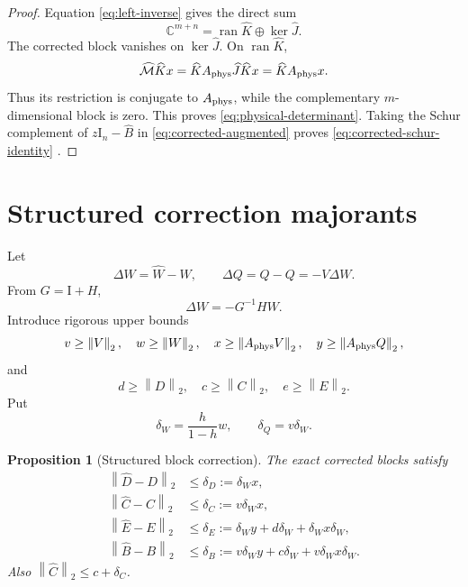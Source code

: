 \documentclass[11pt]{article}
\newtheorem{proposition}[theorem]{Proposition}
\theoremstyle{definition}
\theoremstyle{remark}
\newcommand{\C}{\mathbb C}
\newcommand{\Id}{\mathrm I}
\newcommand{\norm}[1]{\left\lVert#1\right\rVert}
\newcommand{\Aphys}{A_{\rm phys}}
\newcommand{\Mcorrected}{\widehat{\mathcal M}}
\begin{document}
\begin{proof}
Equation \cref{eq:left-inverse} gives the direct sum
\[
 \C^{m+n}=\operatorname{ran}\widehat K\oplus\ker\widehat J.
\]
The corrected block vanishes on \(\ker\widehat J\).  On
\(\operatorname{ran}\widehat K\),
\[
 \Mcorrected\widehat Kx
 =\widehat K\Aphys\widehat J\widehat Kx
 =\widehat K\Aphys x.
\]
Thus its restriction is conjugate to \(\Aphys\), while the complementary
\(m\)-dimensional block is zero.  This proves
\cref{eq:physical-determinant}.  Taking the Schur complement of
\(z\Id_n-\widehat B\) in \cref{eq:corrected-augmented} proves
\cref{eq:corrected-schur-identity}
\citep{HornJohnson2013}.
\end{proof}

\section{Structured correction majorants}
\label{sec:majorants}

Let
\[
 \Delta W=\widehat W-W,\qquad
 \Delta Q=\widehat Q-Q=-V\Delta W.
\]
From \(G=\Id+H\),
\begin{equation}
 \Delta W=-G^{-1}HW.
 \label{eq:delta-w}
\end{equation}
Introduce rigorous upper bounds
\begin{equation}
 v\geq\norm{V}_2,\quad
 w\geq\norm{W}_2,\quad
 x\geq\norm{\Aphys V}_2,\quad
 y\geq\norm{\Aphys Q}_2,
 \label{eq:base-norms}
\end{equation}
and
\begin{equation}
 d\geq\norm{D}_2,\quad
 c\geq\norm{C}_2,\quad
 e\geq\norm{E}_2.
 \label{eq:block-norms}
\end{equation}
Put
\begin{equation}
 \delta_W=\frac{h}{1-h}w,\qquad
 \delta_Q=v\delta_W.
 \label{eq:pair-majorants}
\end{equation}

\begin{proposition}[Structured block correction]
\label{prop:block-majorants}
The exact corrected blocks satisfy
\begin{align}
 \norm{\widehat D-D}_2
 &\leq \delta_D:=\delta_W x,
 \label{eq:delta-d}\\
 \norm{\widehat C-C}_2
 &\leq \delta_C:=v\delta_W x,
 \label{eq:delta-c}\\
 \norm{\widehat E-E}_2
 &\leq \delta_E:=
 \delta_W y+d\delta_W+\delta_Wx\delta_W,
 \label{eq:delta-e}\\
 \norm{\widehat B-B}_2
 &\leq \delta_B:=
 v\delta_Wy+c\delta_W+v\delta_Wx\delta_W.
 \label{eq:delta-b}
\end{align}
Also \(\norm{\widehat C}_2\leq c+\delta_C\).
\end{proposition}
\end{document}
